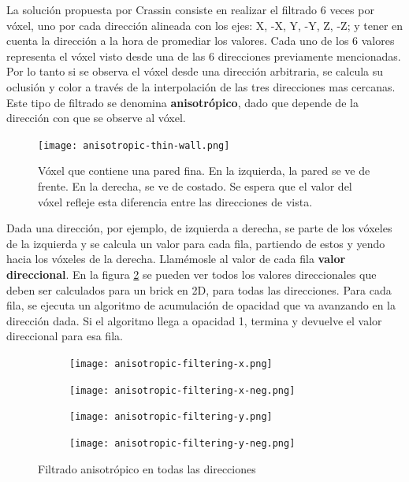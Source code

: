 La solución propuesta por Crassin \cite{voxel-cone-tracing} consiste en realizar el filtrado 6 veces por vóxel, uno por cada dirección alineada con los ejes: X, -X, Y, -Y, Z, -Z; y tener en cuenta la dirección a la hora de promediar los valores.
Cada uno de los 6 valores representa el vóxel visto desde una de las 6 direcciones previamente mencionadas. Por lo tanto si se observa el vóxel desde una dirección arbitraria, se calcula su oclusión y color a través de la interpolación de las tres direcciones mas cercanas.
Este tipo de filtrado se denomina \textbf{anisotrópico}, dado que depende de la dirección con que se observe al vóxel.

\begin{figure}
    \centering
    \texttt{[image: anisotropic-thin-wall.png]}
    \caption{
        Vóxel que contiene una pared fina.
        En la izquierda, la pared se ve de frente.
        En la derecha, se ve de costado.
        Se espera que el valor del vóxel refleje esta diferencia entre las direcciones de vista.
    }
    \label{fig:anisotropic-thin-wall}
\end{figure}

Dada una dirección, por ejemplo, de izquierda a derecha, se parte de los vóxeles de la izquierda y se calcula un valor para cada fila, partiendo de estos y yendo hacia los vóxeles de la derecha.
Llamémosle al valor de cada fila \textbf{valor direccional}.
En la figura \ref{fig:svo_filtering_anisotropic} se pueden ver todos los valores direccionales que deben ser calculados para un brick en 2D, para todas las direcciones.
Para cada fila, se ejecuta un algoritmo de acumulación de opacidad que va avanzando en la dirección dada.
Si el algoritmo llega a opacidad 1, termina y devuelve el valor direccional para esa fila.

\begin{figure}
    \begin{center}
        \begin{subfigure}{.24\textwidth}
            \texttt{[image: anisotropic-filtering-x.png]}
        \end{subfigure}
        \begin{subfigure}{.24\textwidth}
            \texttt{[image: anisotropic-filtering-x-neg.png]}
        \end{subfigure}
        \begin{subfigure}{.24\textwidth}
            \texttt{[image: anisotropic-filtering-y.png]}
        \end{subfigure}
        \begin{subfigure}{.24\textwidth}
            \texttt{[image: anisotropic-filtering-y-neg.png]}
        \end{subfigure}
    \end{center}
    \caption{Filtrado anisotrópico en todas las direcciones}
    \label{fig:svo_filtering_anisotropic}
\end{figure}

